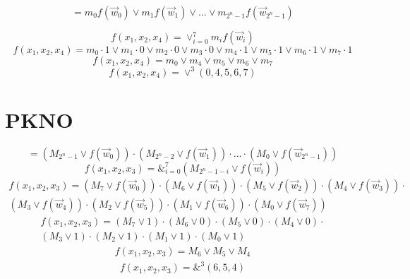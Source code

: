 \documentclass[a4paper]{report}
\begin{document}
\begin{equation}
=m_0 f(\vec{w}_0) \vee m_1 f(\vec{w}_1) \vee ... \vee m_{2^n-1} f(\vec{w}_{2^n-1})
\end{equation}

\begin{equation}
    f(x_1,x_2,x_4)=\vee_{i=0}^{7}m_i f(\vec{w}_i)
\end{equation}
\begin{equation}
    f(x_1,x_2,x_4)=m_0 \cdot 1 \vee m_1 \cdot 0 \vee m_2 \cdot 0 \vee m_3 \cdot 0 \vee m_4 \cdot 1 \vee m_5 \cdot 1 \vee m_6 \cdot 1 \vee m_7 \cdot 1 
\end{equation}
\begin{equation}
    f(x_1,x_2,x_4)=m_0 \vee m_4 \vee m_5  \vee m_6  \vee m_7
\end{equation}
\begin{equation}
    f(x_1,x_2,x_4)=\vee^3(0,4,5,6,7)
\end{equation}

\section{PKNO}
\begin{equation}
=\left(M_{2^n-1} \vee f(\vec{w}_0)\right) \cdot \left(M_{2^n-2} \vee f(\vec{w}_1)\right) \cdot ... \cdot \left(M_0 \vee f(\vec{w}_{2^n-1})\right)
\end{equation}
\begin{equation}
    f(x_1,x_2,x_3)=\&_{i=0}^{7}\left( M_{2^{n}-1-i} \vee f(\vec{w}_i)\right)
\end{equation}
\begin{align}
    f(x_1,x_2,x_3)=\left( M_{7} \vee f(\vec{w}_0)\right) \cdot \left( M_{6} \vee f(\vec{w}_1)\right) \cdot
    \left( M_{5} \vee f(\vec{w}_2)\right) \cdot
    \left( M_{4} \vee f(\vec{w}_3)\right) \cdot\\
    \left( M_{3} \vee f(\vec{w}_4)\right) \cdot
    \left( M_{2} \vee f(\vec{w}_5)\right) \cdot
    \left( M_{1} \vee f(\vec{w}_6)\right) \cdot
    \left( M_{0} \vee f(\vec{w}_7)\right) 
\end{align}
\begin{align}
    f(x_1,x_2,x_3)=\left( M_{7} \vee 1\right) \cdot \left( M_{6} \vee 0\right) \cdot
    \left( M_{5} \vee 0\right) \cdot
    \left( M_{4} \vee 0\right) \cdot\\
    \left( M_{3} \vee 1\right) \cdot
    \left( M_{2} \vee 1\right) \cdot
    \left( M_{1} \vee 1\right) \cdot
    \left( M_{0} \vee 1\right) 
\end{align}
\begin{align}
    f(x_1,x_2,x_3)= M_{6} \vee M_5 \vee M_4 
\end{align}
\begin{align}
    f(x_1,x_2,x_3)= \&^3(6,5,4)
\end{align}
\end{document}
